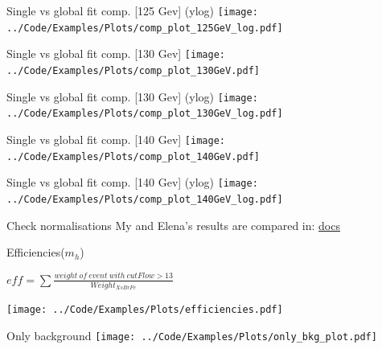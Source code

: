 \documentclass[10pt,UKenglish, leqno, xcolor = dvipsnames]{beamer}
\begin{document}
		\begin{frame}{Single vs global fit comp. [125 Gev] (ylog)}
			\vfill
			\texttt{[image: ../Code/Examples/Plots/comp\_plot\_125GeV\_log.pdf]}
			\vfill
		\end{frame}
	
		\begin{frame}{Single vs global fit comp. [130 Gev]}
			\vfill
			\texttt{[image: ../Code/Examples/Plots/comp\_plot\_130GeV.pdf]}
			\vfill
		\end{frame}
		
		\begin{frame}{Single vs global fit comp. [130 Gev] (ylog)}
			\vfill
			\texttt{[image: ../Code/Examples/Plots/comp\_plot\_130GeV\_log.pdf]}
			\vfill
		\end{frame}
	
		\begin{frame}{Single vs global fit comp. [140 Gev]}
			\vfill
			\texttt{[image: ../Code/Examples/Plots/comp\_plot\_140GeV.pdf]}
			\vfill
		\end{frame}
		
		\begin{frame}{Single vs global fit comp. [140 Gev] (ylog)}
			\vfill
			\texttt{[image: ../Code/Examples/Plots/comp\_plot\_140GeV\_log.pdf]}
			\vfill
		\end{frame}
	
		\begin{frame}{Check normalisations}
			\vfill
			\centering
			My and Elena's results are compared in:
			\href{https://docs.google.com/spreadsheets/d/1HAke9uer_arNKmDrZkEBPS_DiHJFm9zSdsW57HAgCL4/edit?usp=sharing}{docs}
			\vfill
		\end{frame}
	
		\begin{frame}{Efficiencies($m_h$)}
			\vspace{.5cm}
			\begin{center}
				$eff = \sum\frac{weight\ of\ event\ with\ cutFlow>13}{Weight_{XsBrFe}}$
			\end{center}
			\vspace{.5cm}
			\begin{center}
				\texttt{[image: ../Code/Examples/Plots/efficiencies.pdf]}
			\end{center}
		\end{frame}
	
		\begin{frame}{Only background}
			\vfill
			\texttt{[image: ../Code/Examples/Plots/only\_bkg\_plot.pdf]}
			\vfill
		\end{frame}
	
\end{document}
